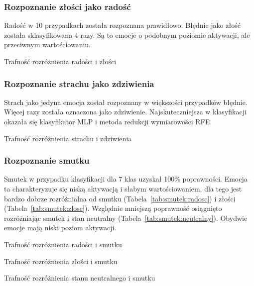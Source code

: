 \documentclass[a4paper,12pt,twoside,openany]{report}
\newcommand{\Tab}[1]{(Tabela~\ref{#1})}
\begin{document}
\subsubsection{Rozpoznanie złości jako radość}
Radość w 10 przypadkach została rozpoznana prawidłowo. 
Błędnie jako złość została sklasyfikowana 4 razy. 
Są to emocje o podobnym poziomie aktywacji, ale przeciwnym wartościowaniu.
\begin{table}[hc!]
	\centering
	
	\caption{Trafność rozróżnienia radości i złości}
\end{table}
\subsubsection{Rozpoznanie strachu jako zdziwienia}
Strach jako jedyna emocja został rozpoznany w większości przypadków błędnie.
Więcej razy została oznaczona jako zdziwienie.
Najskuteczniejsza w klasyfikacji okazała się klasyfikator MLP i metoda redukcji wymiarowości RFE.
\begin{table}[hc!]
	\centering
	
	\caption{Trafność rozróżnienia strachu i zdziwienia}
\end{table}

\subsubsection{Rozpoznanie smutku}
Smutek w przypadku klasyfikacji dla 7 klas uzyskał 100\% poprawności. 
Emocja ta charakteryzuje się niską aktywacją i słabym wartościowaniem,
dla tego jest bardzo dobrze rozróżnialna od smutku \Tab{tab:smutek:radosc} i złości \Tab{tab:smutek:zlosc}.
Względnie mniejszą poprawność osiągnięto rozróżniając smutek i stan neutralny \Tab{tab:smutek:neutralny}.
Obydwie emocje mają niski poziom aktywacji.
\begin{table}[hc!]
	\centering
	
	\caption{Trafność rozróżnienia radości i smutku}
	\label{tab:smutek:radosc}
\end{table}
\begin{table}[hc!]
	\centering
	
	\caption{Trafność rozróżnienia złości i smutku}
	\label{tab:smutek:zlosc}
\end{table}
\begin{table}[hc!]
	\centering
	
	\caption{Trafność rozróżnienia stanu neutralnego i smutku}
	\label{tab:smutek:neutralny}
\end{table}
\end{document}
